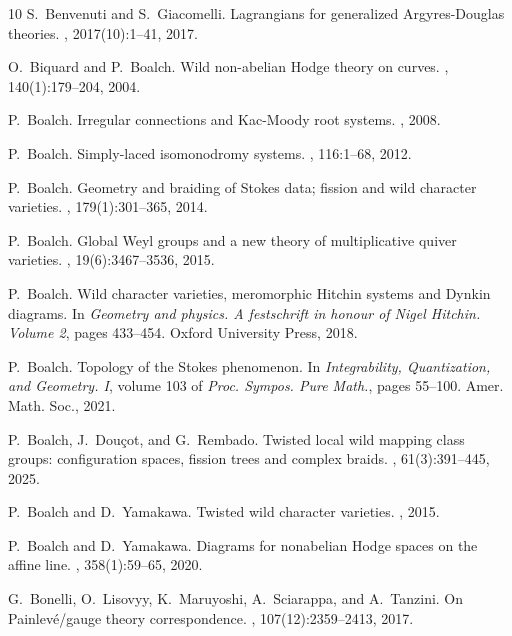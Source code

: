 \documentclass[11pt,a4paper]{amsart}
\numberwithin{equation}{section}
\begin{document}
\begin{thebibliography}{10}
S.~Benvenuti and S.~Giacomelli.
\newblock Lagrangians for generalized {A}rgyres-{D}ouglas theories.
, 2017(10):1--41, 2017.

O.~Biquard and P.~Boalch.
\newblock Wild non-abelian {Hodge} theory on curves.
, 140(1):179--204, 2004.

P.~Boalch.
\newblock Irregular connections and {K}ac-{M}oody root systems.
, 2008.

P.~Boalch.
\newblock Simply-laced isomonodromy systems.
, 116:1--68, 2012.

P.~Boalch.
\newblock Geometry and braiding of {Stokes} data; fission and wild character
  varieties.
, 179(1):301--365, 2014.

P.~Boalch.
\newblock Global {Weyl} groups and a new theory of multiplicative quiver
  varieties.
, 19(6):3467--3536, 2015.

P.~Boalch.
\newblock Wild character varieties, meromorphic {Hitchin} systems and {Dynkin}
  diagrams.
\newblock In {\em Geometry and physics. A festschrift in honour of Nigel
  Hitchin. Volume 2}, pages 433--454. Oxford University Press, 2018.

P.~Boalch.
\newblock Topology of the {S}tokes phenomenon.
\newblock In {\em Integrability, {Q}uantization, and {G}eometry. {I}}, volume
  103 of {\em Proc. Sympos. Pure Math.}, pages 55--100. Amer. Math. Soc., 2021.

P.~Boalch, J.~Dou{\c{c}}ot, and G.~Rembado.
\newblock Twisted local wild mapping class groups: configuration spaces,
  fission trees and complex braids.
, 61(3):391--445, 2025.

P.~Boalch and D.~Yamakawa.
\newblock Twisted wild character varieties.
, 2015.

P.~Boalch and D.~Yamakawa.
\newblock Diagrams for nonabelian {Hodge} spaces on the affine line.
, 358(1):59--65, 2020.

G.~Bonelli, O.~Lisovyy, K.~Maruyoshi, A.~Sciarappa, and A.~Tanzini.
\newblock On {P}ainlev{\'e}/gauge theory correspondence.
, 107(12):2359--2413, 2017.


\end{thebibliography}
\end{document}
